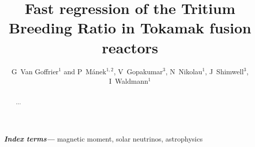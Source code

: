 \documentclass[12pt]{iopart}
\providecommand{\keywords}[1]{\textbf{\textit{Index terms---}} #1}
\begin{document}
\title[Fast regression of the Tritium Breeding Ratio in Tokamaks]{Fast regression of the
Tritium Breeding Ratio in Tokamak fusion reactors} %

\author{G~Van Goffrier$^1$ and P~Mánek$^{1,2}$, V~Gopakumar$^3$, N~Nikolau$^1$, J~Shimwell$^3$, I~Waldmann$^1$}

\address{$^1$ Department of Physics and Astronomy, University College London, Gower Street, London WC1E~6BT, UK}
\address{$^2$ Institute of Experimental and Applied Physics, Czech Technical University, Husova 240/5, Prague 110~00, Czech Republic}
\address{$^3$ UK Atomic Energy Authority, Culham Science Centre, OX14~3DB Abingdon, UK}

\begin{abstract}
... 
\end{abstract}

\keywords{magnetic moment, solar neutrinos, astrophysics}
\submitto{\jpg}
\maketitle

\end{document}
